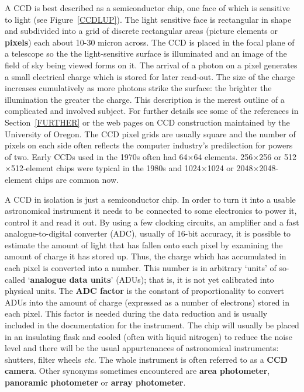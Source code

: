 \documentclass[twoside,11pt]{article}
\newcommand{\htmladdnormallink}[2]{#1}
\newcommand{\html}[1]{}
\newcommand{\latex}[1]{#1}
\begin{document}
A CCD is best described as a semiconductor chip, one face of which is
sensitive to light (see Figure~\ref{CCDLUP}).  The light sensitive face is
rectangular in shape and subdivided into a grid of discrete rectangular
areas (picture elements or {\bf pixels}) each about 10-30 micron across.
The CCD is placed in the focal plane of a telescope so the the
light-sensitive surface is illuminated and an image of the field of sky
being viewed forms on it.  The arrival of a photon on a pixel generates a
small electrical charge which is stored for later read-out.  The size of
the charge increases cumulatively as more photons strike the surface: the
brighter the illumination the greater the charge.
This description is the merest outline of a complicated and involved
subject.  For further details see some of the references in
Section~\ref{FURTHER} or the \htmladdnormallink{web pages on CCD construction}
{http://zebu.uoregon.edu/ccd.html} maintained by the University of Oregon.
The CCD pixel grids are usually square and the number of pixels on each
side often reflects the computer industry's predilection for powers of two.
\latex{Early CCDs used in the 1970s often had 64$\times$64 elements.
256$\times$256 or 512$\times$512-element chips were typical in the
1980s and 1024$\times$1024 or 2048$\times$2048-element chips are
common now.}
\html{Early CCDs used in the 1970s often had 64x64 elements. 256x256
or 512x512-element chips were typical in the 1980s and 1024x1024 or
2048x2048-element chips are common now.}

A CCD in isolation is just a semiconductor chip.  In order to turn it
into a usable astronomical instrument it needs to be connected to some
electronics to power it, control it and read it out.  By using a few
clocking circuits, an amplifier and a fast analogue-to-digital converter
(ADC), usually of 16-bit accuracy, it is possible to estimate the amount of
light that has fallen onto each pixel by examining the amount of charge it
has stored up.  Thus, the charge which has accumulated in each pixel is
converted into a number.  This number is in arbitrary `units' of so-called
`{\bf analogue data units}' (ADUs); that is, it is not yet calibrated into
physical units.  The {\bf ADC factor} is the constant of proportionality
to convert ADUs into the amount of charge (expressed as a number of
electrons) stored in each pixel.  This factor is needed during the data
reduction and is usually included in the documentation for the instrument.
The chip will usually be placed in an insulating flask and cooled (often
with liquid nitrogen) to reduce the noise level and there will be the usual
appurtenances of astronomical instruments: shutters, filter wheels
\emph{etc}.  The whole instrument is often referred to as a {\bf CCD camera}.
Other synonyms sometimes encountered are {\bf area photometer}, {\bf
panoramic photometer} or {\bf array photometer}.
\end{document}
